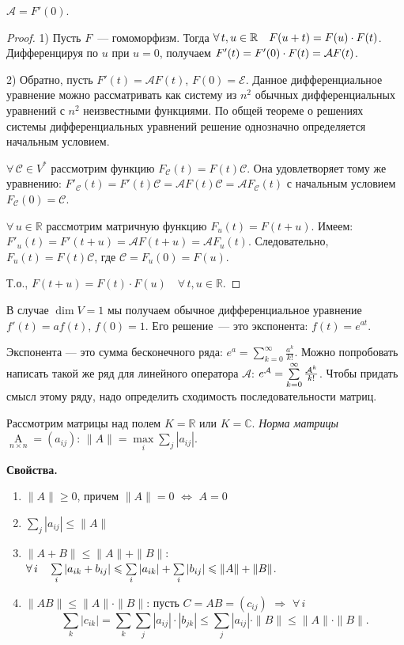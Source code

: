 \documentclass[a4paper]{article}
\newcommand{\svoy}{\vspace{5pt}\noindent\textbf{Свойства.}\vspace{-6pt}}
\newcommand*{\p}[1]{#1\nobreak\discretionary{}{\hbox{$\mathsurround=0pt #1$}}{}}
\begin{document}
\begin{note}
$\mathcal{A}=F'(0)$.
\end{note}

\begin{proof}
1) Пусть $F$~--- гомоморфизм. Тогда $\forall \,
t,u\in\mathbb{R}\quad F(u\p+t)=F(u)\cdot F(t)$. Дифференцируя по $u$
при $u=0$, получаем $F'(t)\p=F'(0)\cdot F(t)=\mathcal{A} F(t)$.

2) Обратно, пусть $F'(t)=\mathcal{A}F(t)$, $F(0)=\mathcal{E}$.
Данное дифференциальное уравнение можно рассматривать как систему из
$n^2$ обычных дифференциальных уравнений с $n^2$ неизвестными
функциями. По общей теореме о решениях системы дифференциальных
уравнений решение однозначно определяется начальным условием.

$\forall \, \mathcal{C}\in V^*$ рассмотрим функцию
$F_\mathcal{C}(t)=F(t)\mathcal{C}$. Она удовлетворяет тому же
уравнению:
$F'_\mathcal{C}(t)=F'(t)\mathcal{C}=\mathcal{A}F(t)\mathcal{C}=\mathcal{A}F_\mathcal{C}(t)$
с начальным условием $F_\mathcal{C}(0)=\mathcal{C}$.

$\forall \, u\in \mathbb{R}$ рассмотрим матричную функцию
$F_u(t)=F(t+u)$. Имеем:
$F'_u(t)=F'(t+u)=\mathcal{A}F(t+u)=\mathcal{A}F_u(t)$.
Следовательно, $F_u(t)=F(t)\mathcal{C}$, где
$\mathcal{C}=F_u(0)=F(u)$.

Т.о., $F(t+u)=F(t)\cdot F(u)\quad \forall \, t,u\in \mathbb{R}$.
\end{proof}

В случае $\dim V=1$ мы получаем обычное дифференциальное уравнение
$f'(t)=af(t)$, $f(0)=1$. Его решение~--- это экспонента:
$f(t)=e^{at}$.

Экспонента --- это сумма бесконечного ряда:
$e^a=\sum\limits_{k=0}^\infty \frac{a^k}{k!}$. Можно попробовать
написать такой же ряд для линейного оператора $\mathcal{A}$:
$e^\mathcal{A}\p=\sum\limits_{k=0}^\infty \frac{\mathcal{A}^k}{k!}$.
Чтобы придать смысл этому ряду, надо определить сходимость
последовательности матриц.

Рассмотрим матрицы над полем $K=\mathbb{R}$ или $K=\mathbb{C}$.
\emph{Норма матрицы} $\mathop{A}\limits_{n\times n}=(a_{ij})$: $\|
A\|= \max\limits_i\sum\limits_j |a_{ij}|$.

\svoy
\begin{enumerate}
  \item $\|A\|\geqslant 0$, причем $\|A\|=0$ $\Leftrightarrow$ $A=0$
  \item $\sum\limits_j|a_{ij}|\leqslant \|A\|$
  \item $\|A+B\|\leqslant \|A\|+\|B\|$: $\forall \, i\quad \sum\limits_i
  |a_{ik}+b_{ij}|\leqslant \sum\limits_i|a_{ik}|+\sum\limits_i|b_{ij}|\leqslant
  \|A\|\p+\|B\|$.
  \item $\|AB\|\leqslant \|A\|\cdot \|B\|$: пусть $C=AB=(c_{ij})$
  $\Rightarrow$ $\forall \, i$ $$\sum\limits_k|c_{ik}|=\sum\limits_k\sum
  \limits_j|a_{ij}|\cdot|b_{jk}|\leqslant \sum\limits_j|a_{ij}|\cdot \|B\|\leqslant
  \|A\|\cdot\|B\|.$$
\end{enumerate}
\end{document}
